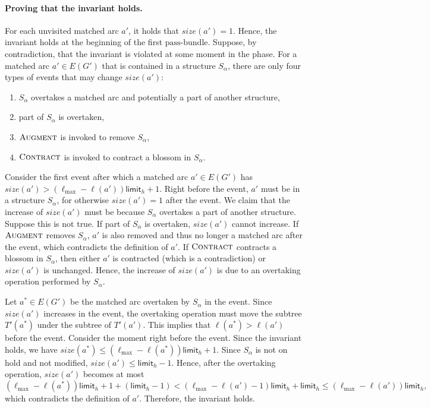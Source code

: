 \documentclass{article}
\newcommand{\alp}{\alpha}
\newcommand{\lmax}{\ell_{\max}}
\newcommand{\bundle}{\text{pass-bundle}\xspace}
\newcommand{\limit}{\mathsf{limit}}
\newcommand{\algAugment}{\textsc{Augment}\xspace}
\newcommand{\algContract}{\textsc{Contract}\xspace}
\begin{document}
\paragraph{Proving that the invariant holds.}
For each unvisited matched arc $a'$, it holds that $size(a') = 1$.
Hence, the invariant holds at the beginning of the first $\bundle$.
Suppose, by contradiction, that the invariant is violated at some moment in the phase.
For a matched arc $a' \in E(G')$ that is contained in a structure $S_\alp$, there are only four types of events that may change $size(a')$:
\begin{enumerate}
    \item $S_\alp$ overtakes a matched arc and potentially a part of another structure,
    \item part of $S_\alp$ is overtaken,
    \item $\algAugment$ is invoked to remove $S_\alp$,
    \item $\algContract$ is invoked to contract a blossom in $S_\alp$.
\end{enumerate}
Consider the first event after which a matched arc $a' \in E(G')$ has $size(a') > (\lmax - \ell(a'))\limit_h + 1$.
Right before the event, $a'$ must be in a structure $S_\alp$, for otherwise $size(a') = 1$ after the event.
We claim that the increase of $size(a')$ must be because $S_\alp$ overtakes a part of another structure.
Suppose this is not true.
If part of $S_\alp$ is overtaken, $size(a')$ cannot increase.
If $\algAugment$ removes $S_\alp$, $a'$ is also removed and thus no longer a matched arc after the event, which contradicts the definition of $a'$.
If $\algContract$ contracts a blossom in $S_\alp$, then either $a'$ is contracted (which is a contradiction) or $size(a')$ is unchanged.
Hence, the increase of $size(a')$ is due to an overtaking operation performed by $S_\alp$.

Let $a^* \in E(G')$ be the matched arc overtaken by $S_\alp$ in the event.
Since $size(a')$ increases in the event, the overtaking operation must move the subtree $T'(a^*)$ under the subtree of $T'(a')$.
This implies that $\ell(a^*) > \ell(a')$ before the event.
Consider the moment right before the event.
Since the invariant holds, we have $size(a^*) \leq (\lmax - \ell(a^*))\limit_h + 1$.
Since $S_\alp$ is not on hold and not modified, $size(a') \leq \limit_h - 1$.
Hence, after the overtaking operation, $size(a')$ becomes at most
\[
(\lmax - \ell(a^*))\limit_h + 1 + (\limit_h - 1) < (\lmax - \ell(a') - 1)\limit_h + \limit_h \leq (\lmax - \ell(a'))\limit_h,
\]
which contradicts the definition of $a'$.
Therefore, the invariant holds.
\end{document}
